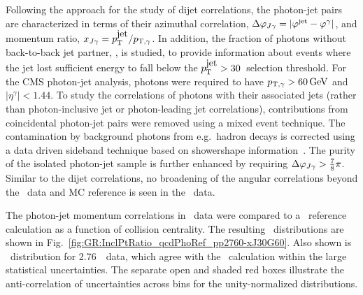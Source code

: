 Following the approach for the study of dijet correlations, the photon-jet pairs
are characterized in terms of their azimuthal correlation, $\Delta\varphi_{J\gamma} = |\varphi^\mathrm{jet} - \varphi^{\gamma}|$,
 and momentum ratio, $x_{J\gamma} = p_{\mathrm{T}}^{\mbox{jet}}/p_{\mathrm{T},\gamma}$. In addition, the fraction of photons without
back-to-back jet partner,  \rjg, is studied, to provide information about
events where the jet lost sufficient energy to fall below the $p_{\mathrm{T}}^{\mbox{jet}} > 30$\GeVc\ 
selection threshold.
For the CMS photon-jet analysis, photons were required to have $p_{\mathrm{T},\gamma} > 60\,\mathrm{GeV}$
and  $|\eta^\gamma|<1.44$. 
To study the correlations of
photons with their associated jets (rather than photon-inclusive jet or photon-leading
jet correlations), contributions from
coincidental photon-jet pairs were removed using a mixed event technique. The 
contamination by background photons from e.g.\ hadron decays
is corrected using a data driven sideband technique based on showershape 
information~\cite{HIPhoton}. The purity of the isolated photon-jet
sample is further enhanced by requiring $\Delta\varphi_{J\gamma} > \frac{7}{8}\pi$.
Similar to the dijet correlations, no broadening of the angular correlations
beyond the \pp\ data and MC reference is seen in the \PbPb\ data.

The photon-jet momentum correlations in \PbPb\ data were compared to a \PYTHYD\ reference
calculation as a function of collision centrality. The resulting
\xjg\ distributions are shown in Fig.~\ref{fig:GR:InclPtRatio_qcdPhoRef_pp2760-xJ30G60}.
Also shown is \avexjg\ distribution for 2.76\TeV\ \pp\ data, which agree
with the \PYTHYD\ calculation within the large statistical uncertainties.
The separate open and shaded red boxes illustrate the
anti-correlation of uncertainties across bins for the unity-normalized distributions.

